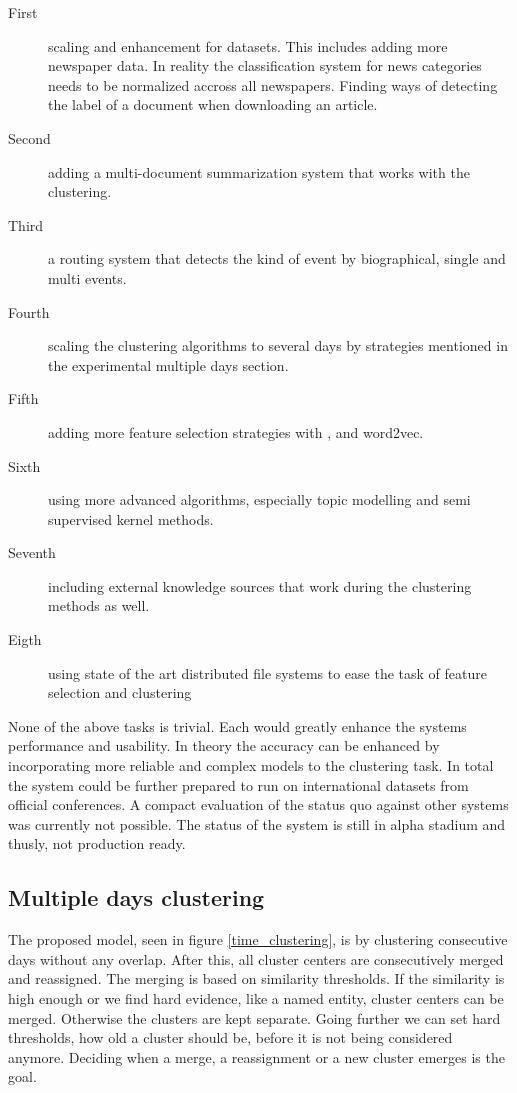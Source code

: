 \begin{description}
  \item[First] scaling and enhancement for datasets. This includes adding more newspaper data. In reality the classification system for news categories needs to be normalized accross all newspapers. Finding ways of detecting the label of a document when downloading an article.
  \item[Second] adding a multi-document summarization system that works with the clustering.
  \item[Third] a routing system that detects the kind of event by biographical, single and multi events.
  \item[Fourth] scaling the clustering algorithms to several days by strategies mentioned in the experimental multiple days section.
  \item[Fifth] adding more feature selection strategies with \wordnet{}, \wiki{} and word2vec.
  \item[Sixth] using more advanced algorithms, especially topic modelling and semi supervised kernel methods.
  \item[Seventh] including external knowledge sources that work during the clustering methods as well.
  \item[Eigth] using state of the art distributed file systems to ease the task of feature selection and clustering
\end{description}

None of the above tasks is trivial. Each would greatly enhance the systems performance and usability. In theory the accuracy can be enhanced by incorporating more reliable and complex models to the clustering task. In total the system could be further prepared to run on international datasets from official conferences. A compact evaluation of the status quo against other systems was currently not possible. The status of the system is still in alpha stadium and thusly, not production ready.

\subsection*{Multiple days clustering}
  The proposed model, seen in figure \ref{time_clustering}, is by clustering consecutive days without any overlap. After this, all cluster centers are consecutively merged and reassigned. The merging is based on similarity thresholds. If the similarity is high enough or we find hard evidence, like a named entity, cluster centers can be merged. Otherwise the clusters are kept separate. Going further we can set hard thresholds, how old a cluster should be, before it is not being considered anymore. Deciding when a merge, a reassignment or a new cluster emerges is the goal.

